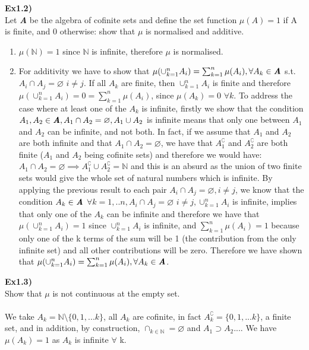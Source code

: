 \documentclass[12pt,mythesisstyle]{report}
\begin{document}
\textbf{Ex1.2)}\\
Let \textbf{\textit{A}} be the algebra of cofinite sets and define the set function \(\mu(A)=1\) if A is finite, and 0 otherwise: show that \(\mu\) is normalised and additive.
\begin{enumerate}
\item \(\mu(\mathbb{N})=1\) since \(\mathbb{N}\) is infinite, therefore \(\mu\) is normalised.\\
\item For additivity we have to show that \(\mu(\cup_{k=1}^nA_i)=\sum_{k=1}^n\mu(A_i), \forall A_k\in\textbf{\textit{A}}\) s.t. \(A_i\cap A_j=\varnothing\) \(i\neq j\). If all \(A_k\) are finite, then \(\cup_{k=1}^nA_i\) is finite and therefore \(\mu(\cup_{k=1}^nA_i)=0=\sum_{k=1}^n\mu(A_i)\), since \(\mu(A_k)=0\) \(\forall k\). To address the case where at least one of the \(A_k\) is infinite, firstly we show that the condition \(A_1, A_2\in\textbf{\textit{A}}, A_1\cap A_2=\varnothing, A_1\cup A_2\) is infinite means that only one between \(A_1\) and \(A_2\) can be infinite, and not both. In fact, if we assume that \(A_1\) and \(A_2\) are both infinite and that \(A_1\cap A_2=\varnothing\), we have that \(A_1^\complement\) and \(A_2^\complement\) are both finite (\(A_1\) and \(A_2\) being cofinite sets) and therefore we would have: \(A_1\cap A_2=\varnothing\implies A_1^\complement\cup A_2^\complement=\mathbb{N}\) and this is an absurd as the union of two finite sets would give the whole set of natural numbers which is infinite. By applying the previous result to each pair \(A_i\cap A_j=\varnothing,  i\neq j\), we know that the condition \(A_k\in\textbf{\textit{A}}\) \(\forall k=1,..n,A_i\cap A_j=\varnothing\) \(i\neq j,\cup_{k=1}^nA_i\) is infinite, implies that only one of the \(A_k\) can be infinite and therefore we have that \(\mu(\cup_{k=1}^nA_i)=1\) since \(\cup_{k=1}^nA_i\) is infinite, and \(\sum_{k=1}^n\mu(A_i)=1\) because only one of the k terms of the sum will be 1 (the contribution from the only infinite set) and all other contributions will be zero. Therefore we have shown that \(\mu(\cup_{k=1}^nA_i)=\sum_{k=1}^n\mu(A_i), \forall A_k\in\textbf{\textit{A}}\).\\
\end{enumerate}

\textbf{Ex1.3)}\\
Show that \(\mu\) is not continuous at the empty set.\\\\
We take $A_k=\mathbb{N}\setminus\{0,1,...k\}$, all $A_k$ are cofinite, in fact $A_k^\complement=\{0,1,...k\}$, a finite set, and in addition, by construction, $\cap_{k\in\mathbb{N}}=\varnothing$ and $A_1\supset A_2...$. We have $\mu(A_k)=1$ as $A_k$ is infinite $\forall$ k.
\end{document}
